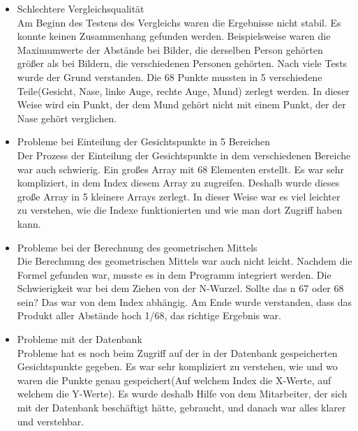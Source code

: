 \begin{itemize}
		Am Beginn war das Umgehen mit der Skripten Aufrufe sehr schwer. Es war schwer zu verstehen wie das genau funktionierte, weil die große Variablenanzahl die Arbeit kompliziert machte. Dieser Anzahl wurde reduziert und es wurden viele Recherchen an der korrekten Verwendung von der sys Pakete gemacht um das Problem zu l{\"o}sen.
		
		\item Schlechtere Vergleichsqualität \\
		
		Am Beginn des Testens des Vergleichs waren die Ergebnisse nicht stabil. Es konnte keinen Zusammenhang gefunden werden. Beispielsweise waren die Maximumwerte der Abstände bei Bilder, die derselben Person gehörten größer als bei Bildern, die verschiedenen Personen gehörten. Nach viele Tests wurde der Grund verstanden. Die 68 Punkte mussten in 5 verschiedene Teile(Gesicht, Nase, linke Auge, rechte Auge, Mund) zerlegt werden. In dieser Weise wird ein Punkt, der dem Mund gehört nicht mit einem Punkt, der der Nase gehört verglichen.
		
		\item Probleme bei Einteilung der Gesichtspunkte in 5 Bereichen \\
		
		Der Prozess der Einteilung der Gesichtspunkte in dem verschiedenen Bereiche war auch schwierig. Ein großes Array mit 68 Elementen erstellt. Es war sehr kompliziert, in dem Index diesem Array zu zugreifen. Deshalb wurde dieses große Array in 5 kleinere Arrays zerlegt. In dieser Weise war es viel leichter zu verstehen, wie die Indexe funktionierten und wie man dort Zugriff haben kann.
		
		\item Probleme bei der Berechnung des geometrischen Mittels \\
		
		Die Berechnung des geometrischen Mittels war auch nicht leicht. Nachdem die Formel gefunden war, musste es in dem Programm integriert werden. Die Schwierigkeit war bei dem Ziehen von der N-Wurzel. Sollte das n 67 oder 68 sein? Das war von dem Index abhängig. Am Ende wurde verstanden, dass das Produkt aller Abstände hoch 1/68, das richtige Ergebnis war.
		
		\item Probleme mit der Datenbank \\
		
		Probleme hat es noch beim Zugriff auf der in der Datenbank gespeicherten Gesichtspunkte gegeben. Es war sehr kompliziert zu verstehen, wie und wo waren die Punkte genau gespeichert(Auf welchem Index die X-Werte, auf welchem die Y-Werte). Es wurde deshalb Hilfe von dem Mitarbeiter, der sich mit der Datenbank beschäftigt hätte, gebraucht, und danach war alles klarer und verstehbar.
		

\end{itemize}
